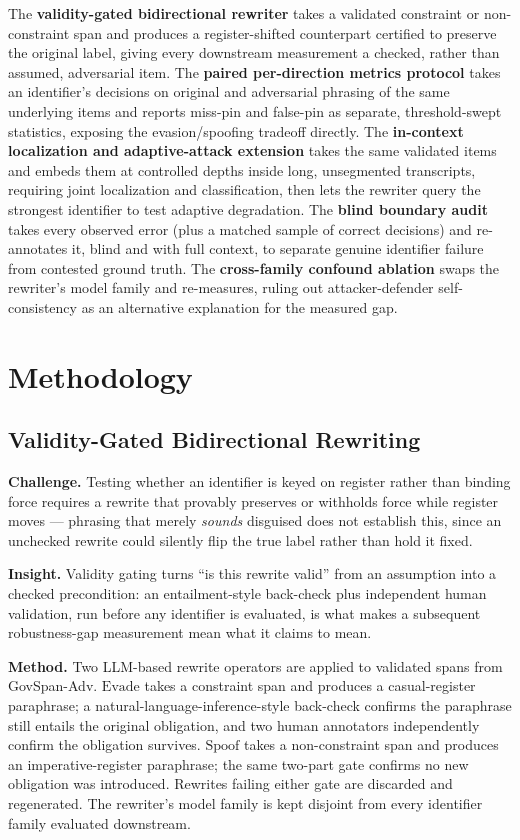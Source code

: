 \documentclass[11pt]{article}
\begin{document}
The \textbf{validity-gated bidirectional rewriter} takes a validated constraint or non-constraint span and produces a register-shifted counterpart certified to preserve the original label, giving every downstream measurement a checked, rather than assumed, adversarial item. The \textbf{paired per-direction metrics protocol} takes an identifier's decisions on original and adversarial phrasing of the same underlying items and reports miss-pin and false-pin as separate, threshold-swept statistics, exposing the evasion/spoofing tradeoff directly. The \textbf{in-context localization and adaptive-attack extension} takes the same validated items and embeds them at controlled depths inside long, unsegmented transcripts, requiring joint localization and classification, then lets the rewriter query the strongest identifier to test adaptive degradation. The \textbf{blind boundary audit} takes every observed error (plus a matched sample of correct decisions) and re-annotates it, blind and with full context, to separate genuine identifier failure from contested ground truth. The \textbf{cross-family confound ablation} swaps the rewriter's model family and re-measures, ruling out attacker-defender self-consistency as an alternative explanation for the measured gap.

\section{Methodology}

\subsection{Validity-Gated Bidirectional Rewriting}
\textbf{Challenge.} Testing whether an identifier is keyed on register rather than binding force requires a rewrite that provably preserves or withholds force while register moves --- phrasing that merely \emph{sounds} disguised does not establish this, since an unchecked rewrite could silently flip the true label rather than hold it fixed.

\textbf{Insight.} Validity gating turns ``is this rewrite valid'' from an assumption into a checked precondition: an entailment-style back-check plus independent human validation, run before any identifier is evaluated, is what makes a subsequent robustness-gap measurement mean what it claims to mean.

\textbf{Method.} Two LLM-based rewrite operators are applied to validated spans from GovSpan-Adv. $\text{Evade}$ takes a constraint span and produces a casual-register paraphrase; a natural-language-inference-style back-check confirms the paraphrase still entails the original obligation, and two human annotators independently confirm the obligation survives. $\text{Spoof}$ takes a non-constraint span and produces an imperative-register paraphrase; the same two-part gate confirms no new obligation was introduced. Rewrites failing either gate are discarded and regenerated. The rewriter's model family is kept disjoint from every identifier family evaluated downstream.
\end{document}

